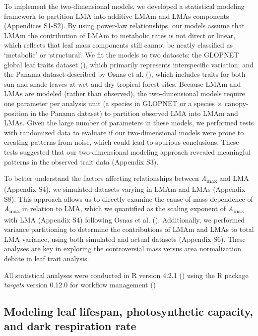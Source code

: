 \documentclass[
  12pt,
  letterpaper,
  DIV=11,
  numbers=noendperiod]{scrartcl}
\begin{document}
To implement the two-dimensional models, we developed a statistical
modeling framework to partition LMA into additive LMAm and LMAs
components (Appendices S1-S2). By using power-law relationships, our
models assume that LMAm the contribution of LMAm to metabolic rates is
not direct or linear, which reflects that leaf mass components still
cannot be neatly classified as `metabolic' or `structural'. We fit the
models to two datasets: the GLOPNET global leaf traits dataset
(), which primarily
represents interspecific variation; and the Panama dataset described by
Osnas et al. (), which includes traits for
both sun and shade leaves at wet and dry tropical forest sites. Because
LMAm and LMAs are modeled (rather than observed), the two-dimensional
models require one parameter per analysis unit (a species in GLOPNET or
a species \(\times\) canopy-position in the Panama dataset) to partition
observed LMA into LMAm and LMAs. Given the large number of parameters in
these models, we performed tests with randomized data to evaluate if our
two-dimensional models were prone to creating patterns from noise, which
could lead to spurious conclusions. These tests suggested that our
two-dimensional modeling approach revealed meaningful patterns in the
observed trait data (Appendix S3).

To better understand the factors affecting relationships between
\emph{A}\textsubscript{max} and LMA (Appendix S4), we simulated datasets
varying in LMAm and LMAs (Appendix S8). This approach allows us to
directly examine the cause of mass-dependence of
\emph{A}\textsubscript{max} in relation to LMA, which we quantified as
the scaling exponent of \emph{A}\textsubscript{max} with LMA (Appendix
S4) following Osnas et al. ().
Additionally, we performed variance partitioning to determine the
contributions of LMAm and LMAs to total LMA variance, using both
simulated and actual datasets (Appendix S6). These analyses are key in
exploring the controversial mass versus area normalization debate in
leaf trait analysis.

All statistical analyses were conducted in R version 4.2.1
() using the R package
\emph{targets} version 0.12.0 for workflow management
()

\subsection{Modeling leaf lifespan, photosynthetic capacity, and dark
respiration
rate}\label{modeling-leaf-lifespan-photosynthetic-capacity-and-dark-respiration-rate}
\end{document}
